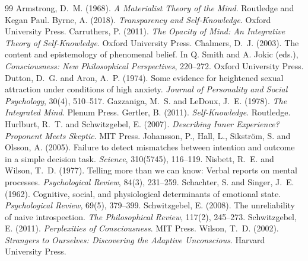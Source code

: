 \documentclass{situationist-preprint}
\begin{document}
\begin{thebibliography}{99}\small
{} Armstrong, D.~M. (1968). \emph{A Materialist Theory of the Mind}. Routledge and Kegan Paul.
 Byrne, A. (2018). \emph{Transparency and Self-Knowledge}. Oxford University Press.
 Carruthers, P. (2011). \emph{The Opacity of Mind: An Integrative Theory of Self-Knowledge}. Oxford University Press.
 Chalmers, D.~J. (2003). The content and epistemology of phenomenal belief. In Q. Smith and A. Jokic (eds.), \emph{Consciousness: New Philosophical Perspectives}, 220--272. Oxford University Press.
 Dutton, D.~G. and Aron, A.~P. (1974). Some evidence for heightened sexual attraction under conditions of high anxiety. \emph{Journal of Personality and Social Psychology}, 30(4), 510--517.
 Gazzaniga, M.~S. and LeDoux, J.~E. (1978). \emph{The Integrated Mind}. Plenum Press.
 Gertler, B. (2011). \emph{Self-Knowledge}. Routledge.
 Hurlburt, R.~T. and Schwitzgebel, E. (2007). \emph{Describing Inner Experience? Proponent Meets Skeptic}. MIT Press.
 Johansson, P., Hall, L., Sikstr\"om, S. and Olsson, A. (2005). Failure to detect mismatches between intention and outcome in a simple decision task. \emph{Science}, 310(5745), 116--119.
 Nisbett, R.~E. and Wilson, T.~D. (1977). Telling more than we can know: Verbal reports on mental processes. \emph{Psychological Review}, 84(3), 231--259.
 Schachter, S. and Singer, J.~E. (1962). Cognitive, social, and physiological determinants of emotional state. \emph{Psychological Review}, 69(5), 379--399.
 Schwitzgebel, E. (2008). The unreliability of naive introspection. \emph{The Philosophical Review}, 117(2), 245--273.
 Schwitzgebel, E. (2011). \emph{Perplexities of Consciousness}. MIT Press.
 Wilson, T.~D. (2002). \emph{Strangers to Ourselves: Discovering the Adaptive Unconscious}. Harvard University Press.
\end{thebibliography}
\end{document}
